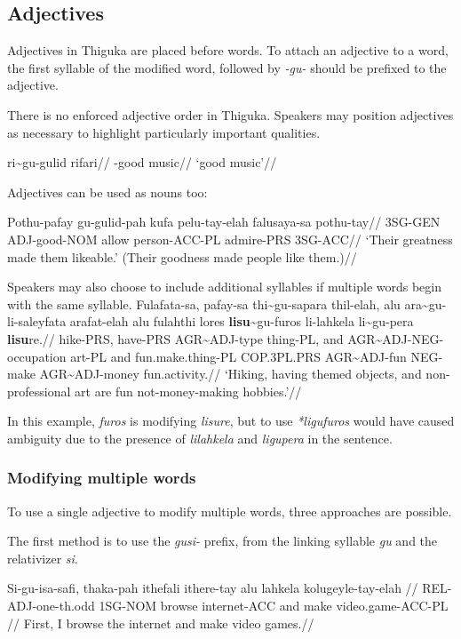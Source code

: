 
\subsection{Adjectives}
Adjectives in Thiguka are placed before words.
To attach an adjective to a word, the first syllable of the modified word, followed by \emph{-gu-} should be prefixed to the adjective.

There is no enforced adjective order in Thiguka. Speakers may position adjectives as necessary to highlight particularly important qualities.

\ex
\begingl
    \gla ri\~{}{}gu-gulid rifari//
    \glb \agradj{}-good music//
    \glft`good music'//
\endgl
\xe

Adjectives can be used as nouns too:

\ex
\begingl
    \gla Pothu-pafay gu-gulid-pah kufa pelu-tay-elah falusaya-sa pothu-tay//
    \glb 3SG-GEN ADJ-good-NOM allow person-ACC-PL admire-PRS 3SG-ACC//
    \glft`Their greatness made them likeable.' (Their goodness made people like them.)//
\endgl
\xe

Speakers may also choose to include additional syllables if multiple words begin with the same syllable.
\begingl
\ex
    \gla Fulafata-sa, pafay-sa thi\~{}gu-sapara thil-elah, alu ara\~{}gu-li-saleyfata arafat-elah alu fulahthi lores \textbf{lisu}\~{}gu-furos li-lahkela li\~{}gu-pera \textbf{lisu}re.//
    \glb hike-PRS, have-PRS AGR\~{}ADJ-type thing-PL, and AGR\~{}ADJ-NEG-occupation art-PL and fun.make.thing-PL COP.3PL.PRS AGR\~{}ADJ-fun NEG-make AGR\~{}ADJ-money fun.activity.//
    \glft `Hiking, having themed objects, and non-professional art are fun not-money-making hobbies.'//
\endgl
\xe    

In this example, \textit{furos} is modifying \textit{lisure}, but to use \textit{*ligufuros} would have caused ambiguity due to the presence of \textit{lilahkela} and \textit{ligupera} in the sentence.

\subsubsection{Modifying multiple words}
To use a single adjective to modify multiple words, three approaches are possible.

The first method is to use the \textit{gusi-} prefix, from the linking syllable \textit{gu} and the relativizer \textit{si}.

\ex
\begingl
\gla Si-gu-isa-safi,    thaka-pah ithefali ithere-tay alu lahkela kolugeyle-tay-elah   //
\glb             REL-ADJ-one-th.odd 1SG-NOM   browse   internet-ACC and make    video.game-ACC-PL  //
\glft First, I browse the internet and make video games.//
\endgl
\xe


